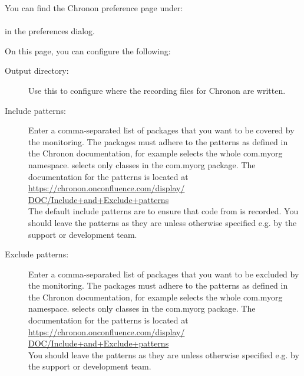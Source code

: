 

You can find the Chronon preference page under:\\
\\
in the preferences dialog.

On this page, you can configure the following:
\begin{description}
\item [Output directory:]{Use this to configure where the recording files for Chronon are written.}
\item [Include patterns:]{Enter a comma-separated list of packages that you want to be covered by the monitoring. The packages must adhere to the patterns as defined in the Chronon documentation, for example  selects the whole com.myorg namespace.  selects only classes in the com.myorg package. The documentation for the patterns is located at \\
\href{https://chronon.onconfluence.com/display/DOC/Include+and+Exclude+patterns}{https://chronon.onconfluence.com/display/\\
DOC/Include+and+Exclude+patterns}\\ 
The default include patterns are to ensure that code from \app{} is recorded. You should leave the patterns as they are unless otherwise specified e.g. by the support or development team.}
\item [Exclude patterns:]{Enter a comma-separated list of packages that you want to be excluded by the monitoring. The packages must adhere to the patterns as defined in the Chronon documentation, for example  selects the whole com.myorg namespace.  selects only classes in the com.myorg package. The documentation for the patterns is located at \\
\href{https://chronon.onconfluence.com/display/DOC/Include+and+Exclude+patterns}{https://chronon.onconfluence.com/display/\\
DOC/Include+and+Exclude+patterns}\\
 You should leave the patterns as they are unless otherwise specified e.g. by the support or development team.}
\end{description}
